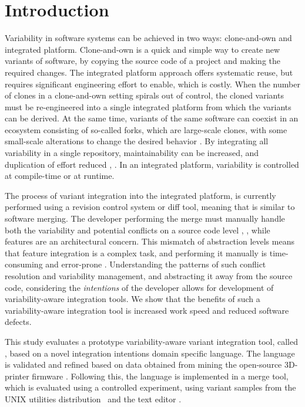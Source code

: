 \chapter{Introduction}
Variability in software systems can be achieved in two ways: clone-and-own and integrated platform. Clone-and-own is a quick and simple way to create new variants of software, by copying the source code of a project and making the required changes. The integrated platform approach offers systematic reuse, but requires significant engineering effort to enable, which is costly. When the number of clones in a clone-and-own setting spirals out of control, the cloned variants must be re-engineered into a single integrated platform from which the variants can be derived. At the same time, variants of the same software can coexist in an ecosystem consisting of so-called forks, which are large-scale clones, with some small-scale alterations to change the desired behavior \cite{stanciulescu2015}. By integrating all variability in a single repository, maintainability can be increased, and duplication of effort reduced \cite{schmorleiz2016similarity}, \cite{stanciulescu2015}. In an integrated platform, variability is controlled at compile-time or at runtime.

The process of variant integration into the integrated platform, is currently performed using a revision control system or diff tool, meaning that is similar to software merging. The developer performing the merge must manually handle both the variability and potential conflicts on a source code level \cite{mens2002}, \cite{apel2011}, while features are an architectural concern. This mismatch of abstraction levels means that feature integration is a complex task, and performing it manually is time-consuming and error-prone \cite{melo2016latin}. Understanding the patterns of such conflict resolution and variability management, and abstracting it away from the source code, considering the \textit{intentions} of the developer allows for development of variability-aware integration tools. We show that the benefits of such a variability-aware integration tool is increased work speed and reduced software defects.

This study evaluates a prototype variability-aware variant integration tool, called \tooln, based on a novel integration intentions domain specific language.
The language is validated and refined based on data obtained from mining the open-source 3D-printer firmware \marlin. Following this, the language is implemented in a merge tool, which is evaluated using a controlled experiment, using variant samples from the UNIX utilities distribution \busybox~and the text editor \vim.

